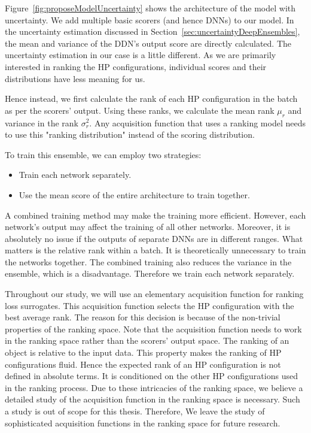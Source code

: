 \documentclass[12pt, twoside, ngerman]{report}
\begin{document}
Figure~\ref{fig:proposeModelUncertainty} shows the architecture of the model with uncertainty.
We add multiple basic scorers (and hence DNNs) to our model.
In the uncertainty estimation discussed in Section~\ref{sec:uncertaintyDeepEnsembles}, the mean and variance of the DDN's output score are directly calculated.
The uncertainty estimation in our case is a little different.
As we are primarily interested in ranking the HP configurations, individual scores and their distributions have less meaning for us.

Hence instead, we first calculate the rank of each HP configuration in the batch as per the scorers' output.
Using these ranks, we calculate the mean rank $\mu_r$ and variance in the rank $\sigma^2_r$.
Any acquisition function that uses a ranking model needs to use this "ranking distribution" instead of the scoring distribution.

To train this ensemble, we can employ two strategies:
\begin{itemize}
\item Train each network separately.
\item Use the mean score of the entire architecture to train together.
\end{itemize}
A combined training method may make the training more efficient.
However,  each network's output may affect the training of all other networks.
Moreover, it is absolutely no issue if the outputs of separate DNNs are in different ranges. What matters is the relative rank within a batch.
It is theoretically unnecessary to train the networks together.
The combined training also reduces the variance in the ensemble, which is a disadvantage.
Therefore we train each network separately.

Throughout our study, we will use an elementary acquisition function for ranking loss surrogates. This acquisition function selects the HP configuration with the best average rank.
The reason for this decision is because of the non-trivial properties of the ranking space.
Note that the acquisition function needs to work in the ranking space rather than the scorers' output space.
The ranking of an object is relative to the input data. This property makes the ranking of HP configurations fluid.
Hence the expected rank of an HP configuration is not defined in absolute terms. It is conditioned on the other HP configurations used in the ranking process.
Due to these intricacies of the ranking space, we believe a detailed study of the acquisition function in the ranking space is necessary. Such a study is out of scope for this thesis. Therefore, We leave the study of sophisticated acquisition functions in the ranking space for future research.
\end{document}
